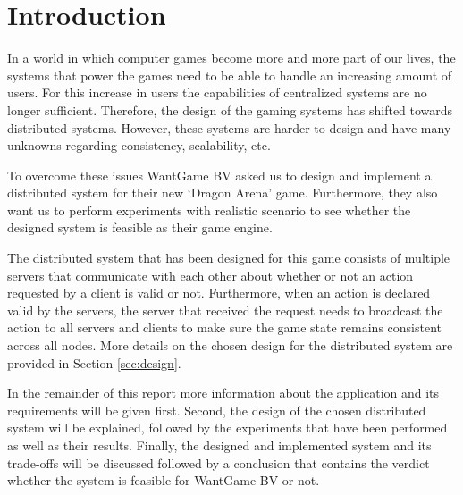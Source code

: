 \section{Introduction}
In a world in which computer games become more and more part of our lives, the systems that power the games need to be able to handle an increasing amount of users.
For this increase in users the capabilities of centralized systems are no longer sufficient.
Therefore, the design of the gaming systems has shifted towards distributed systems.
However, these systems are harder to design and have many unknowns regarding consistency, scalability, etc.

To overcome these issues WantGame BV asked us to design and implement a distributed system for their new `Dragon Arena' game.
Furthermore, they also want us to perform experiments with realistic scenario to see whether the designed system is feasible as their game engine.

The distributed system that has been designed for this game consists of multiple servers that communicate with each other about whether or not an action requested by a client is valid or not. 
Furthermore, when an action is declared valid by the servers, the server that received the request needs to broadcast the action to all servers and clients to make sure the game state remains consistent across all nodes.
More details on the chosen design for the distributed system are provided in Section \ref{sec:design}.

In the remainder of this report more information about the application and its requirements will be given first. Second, the design of the chosen distributed system will be explained, followed by the experiments that have been performed as well as their results.
Finally, the designed and implemented system and its trade-offs will be discussed followed by a conclusion that contains the verdict whether the system is feasible for WantGame BV or not.